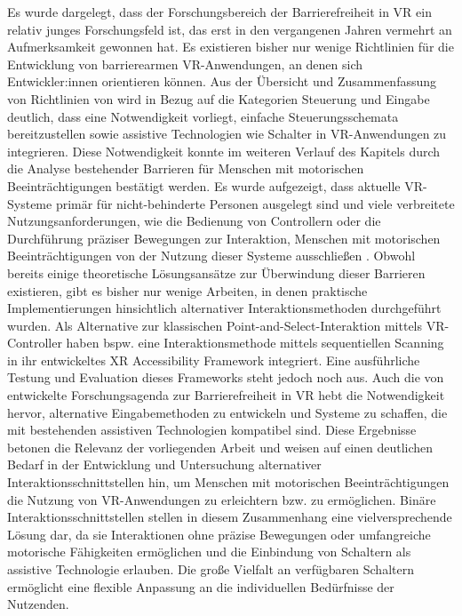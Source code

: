 Es wurde dargelegt, dass der Forschungsbereich der Barrierefreiheit in VR ein relativ junges Forschungsfeld ist, das erst in den vergangenen Jahren vermehrt an Aufmerksamkeit gewonnen hat. Es existieren bisher nur wenige Richtlinien für die Entwicklung von barrierearmen VR-Anwendungen, an denen sich Entwickler:innen orientieren können. Aus der Übersicht und Zusammenfassung von Richtlinien von \citet{heilemann_accessibility_2021} wird in Bezug auf die Kategorien Steuerung und Eingabe deutlich, dass eine Notwendigkeit vorliegt, einfache Steuerungsschemata bereitzustellen sowie assistive Technologien wie Schalter in VR-Anwendungen zu integrieren. Diese Notwendigkeit konnte im weiteren Verlauf des Kapitels durch die Analyse bestehender Barrieren für Menschen mit motorischen Beeinträchtigungen bestätigt werden. Es wurde aufgezeigt, dass aktuelle VR-Systeme primär für nicht-behinderte Personen ausgelegt sind \citep{wong_survey_2017}  und viele verbreitete Nutzungsanforderungen, wie die Bedienung von Controllern oder die Durchführung präziser Bewegungen zur Interaktion, Menschen mit motorischen Beeinträchtigungen von der Nutzung dieser Systeme ausschließen \citep{dombrowski_designing_2019}. Obwohl bereits einige theoretische Lösungsansätze zur Überwindung dieser Barrieren existieren, gibt es bisher nur wenige Arbeiten, in denen praktische Implementierungen hinsichtlich alternativer Interaktionsmethoden durchgeführt wurden. Als Alternative zur klassischen Point-and-Select-Interaktion mittels VR-Controller haben bspw. \citet{valakou_framework_2024} eine Interaktionsmethode mittels sequentiellen Scanning in ihr entwickeltes XR Accessibility Framework integriert. Eine ausführliche Testung und Evaluation dieses Frameworks steht jedoch noch aus. Auch die von \citet{creed_inclusive_2024_2} entwickelte Forschungsagenda zur Barrierefreiheit in VR hebt die Notwendigkeit hervor, alternative Eingabemethoden zu entwickeln und Systeme zu schaffen, die mit bestehenden assistiven Technologien kompatibel sind.
Diese Ergebnisse betonen die Relevanz der vorliegenden Arbeit und weisen auf einen deutlichen Bedarf in der Entwicklung und Untersuchung alternativer Interaktionsschnittstellen hin, um Menschen mit motorischen Beeinträchtigungen die Nutzung von VR-Anwendungen zu erleichtern bzw. zu ermöglichen. Binäre Interaktionsschnittstellen stellen in diesem Zusammenhang eine vielversprechende Lösung dar, da sie Interaktionen ohne präzise Bewegungen oder umfangreiche motorische Fähigkeiten ermöglichen und die Einbindung von Schaltern als assistive Technologie erlauben. Die große Vielfalt an verfügbaren Schaltern ermöglicht eine flexible Anpassung an die individuellen Bedürfnisse der Nutzenden. 

